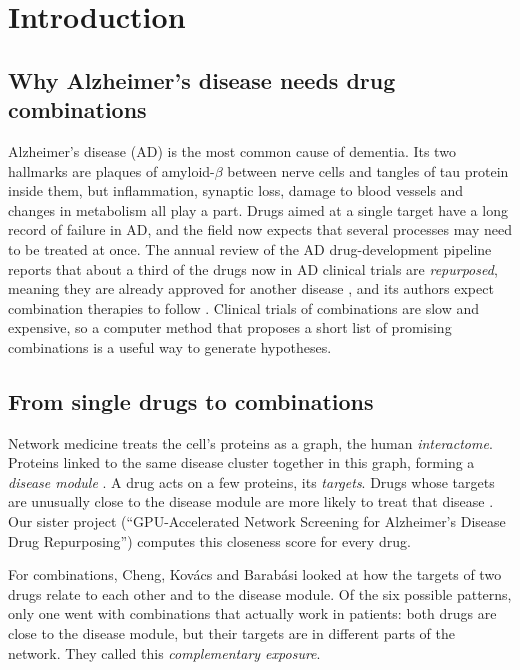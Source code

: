 \section{Introduction}
\label{sec:intro}

\subsection{Why Alzheimer's disease needs drug combinations}

Alzheimer's disease (AD) is the most common cause of dementia. Its two hallmarks are plaques of amyloid-$\beta$ between nerve cells and tangles of tau protein inside them, but inflammation, synaptic loss, damage to blood vessels and changes in metabolism all play a part. Drugs aimed at a single target have a long record of failure in AD, and the field now expects that several processes may need to be treated at once. The annual review of the AD drug-development pipeline reports that about a third of the drugs now in AD clinical trials are \emph{repurposed}, meaning they are already approved for another disease \cite{cummings2025pipeline,cummings2026pipeline}, and its authors expect combination therapies to follow \cite{cummings2026pipeline}. Clinical trials of combinations are slow and expensive, so a computer method that proposes a short list of promising combinations is a useful way to generate hypotheses.

\subsection{From single drugs to combinations}

Network medicine treats the cell's proteins as a graph, the human \emph{interactome}. Proteins linked to the same disease cluster together in this graph, forming a \emph{disease module} \cite{barabasi2011network,menche2015uncovering}. A drug acts on a few proteins, its \emph{targets}. Drugs whose targets are unusually close to the disease module are more likely to treat that disease \cite{guney2016network}. Our sister project (``GPU-Accelerated Network Screening for Alzheimer's Disease Drug Repurposing'') computes this closeness score for every drug.

For combinations, Cheng, Kov\'acs and Barab\'asi \cite{cheng2019combinations} looked at how the targets of two drugs relate to each other and to the disease module. Of the six possible patterns, only one went with combinations that actually work in patients: both drugs are close to the disease module, but their targets are in different parts of the network. They called this \emph{complementary exposure}.

